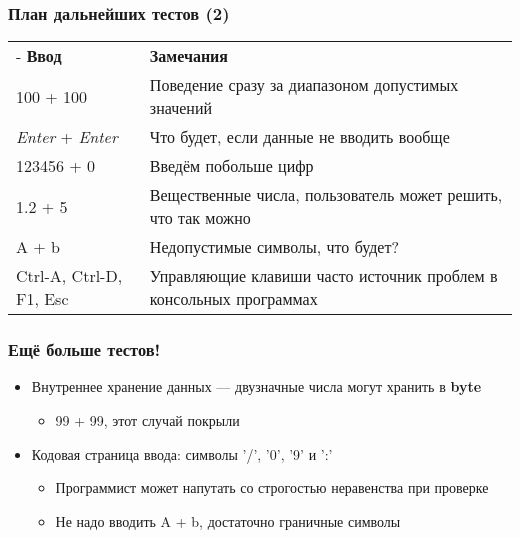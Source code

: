 \documentclass[xetex,mathserif,serif]{beamer}
\begin{document}
	\begin{frame}
		\frametitle{План дальнейших тестов (2)}
		\begin{scriptsize}
			\begin{center}
				\begin{tabu} {| X[2 l p] | X[7 l p] |}
					\tabucline-
					\everyrow{\tabucline-}
					\textbf{Ввод}                   & \textbf{Замечания}                                                 \\
					100 + 100                       & Поведение сразу за диапазоном допустимых значений                  \\
					\textit{Enter} + \textit{Enter} & Что будет, если данные не вводить вообще                           \\
					123456 + 0                      & Введём побольше цифр                                               \\
					1.2 + 5                         & Вещественные числа, пользователь может решить, что так можно       \\
					A + b                           & Недопустимые символы, что будет?                                   \\
					Ctrl-A, Ctrl-D, F1, Esc         & Управляющие клавиши часто источник проблем в консольных программах \\
				\end{tabu}
			\end{center}
		\end{scriptsize}
	\end{frame}

	\begin{frame}
		\frametitle{Ещё больше тестов!}
		\begin{itemize}
			\item Внутреннее хранение данных --- двузначные числа могут хранить в \textbf{byte}
			\begin{itemize}
				\item 99 + 99, этот случай покрыли
			\end{itemize}
			\item Кодовая страница ввода: символы '/', '0', '9' и ':'
			\begin{itemize}
				\item Программист может напутать со строгостью неравенства при проверке
				\item Не надо вводить A + b, достаточно граничные символы
			\end{itemize}
		\end{itemize}
	\end{frame}
\end{document}
